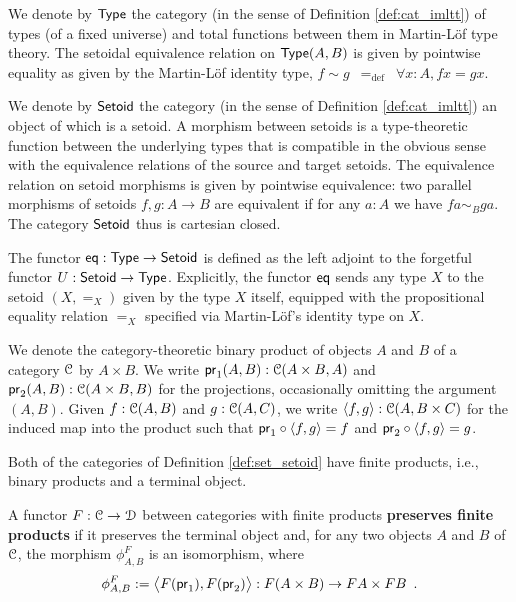 \documentclass[a4paper,USenglish]{lipics}
\newcommand{\fat}[1]{\textbf{#1}}
\begin{document}
\begin{definition}
\label{def:set_setoid}
 We denote by $\Set$ the category (in the sense of Definition \ref{def:cat_imltt}) of types (of a fixed universe) and total functions between them in Martin-L\"of type theory. 
 The setoidal equivalence relation on $\Set(A,B)$ is given by pointwise equality as given by the Martin-Löf identity type,
   $f \sim g \enspace =_{\text{def}} \enspace \forall x:A, fx = gx$.
 
 We denote by $\Setoid$ the category (in the sense of Definition \ref{def:cat_imltt}) an object of which is a setoid.
 A morphism between setoids is a type-theoretic function between the underlying types that is compatible in the obvious sense with the equivalence relations of the source and target setoids.
 The equivalence relation on setoid morphisms is given by pointwise equivalence:
 two parallel morphisms of setoids $f,g:A\to B$ are equivalent if for any $a:A$ we have $fa \sim_B ga$.
 The category $\Setoid$ thus is cartesian closed.
 
\end{definition}



\begin{definition}
\label{def:eq}
 The functor $\eq : \Set\to\Setoid$ is defined as the left adjoint to the forgetful functor $U : \Setoid \to \Set$.
  Explicitly, the functor $\eq$ sends any type $X$ to the setoid $(X,=_X)$ given by the type $X$ itself, equipped
  with the propositional equality relation $=_X$ specified via Martin-L\"of's identity type on $X$.
\end{definition}


\begin{rem}
  We denote the category-theoretic binary product of objects $A$ and $B$ of a category $\C$ by $A\times B$.
  We write $\pr_1(A,B) : \C(A\times B, A)$ and $\pr_2(A,B) :\C(A\times B, B)$ for the projections, occasionally omitting the 
  argument $(A,B)$.
  Given $f : \C(A, B)$ and $g : \C(A,C)$, we write $\langle f,g\rangle : \C(A,B\times C)$ for the induced map into the product such that
  $\comp{\langle f,g\rangle}{\pr_1} = f$ and $\comp{\langle f,g\rangle}{\pr_2} = g$.
\end{rem}

Both of the categories of Definition \ref{def:set_setoid} have finite products, i.e., binary products and a terminal object.

\begin{definition}
\label{def:monoidal_functor}
 A functor $F:\C\to\D$ between categories with finite products \fat{preserves finite products} if it preserves the terminal object and,
 for any two objects $A$ and $B$ of $\C$,
  the morphism $\phi^F_{A,B}$ is an isomorphism, where
 \[ \phi^F_{A,B} := \bigl\langle F(\pr_1), F(\pr_2) \bigr\rangle : F(A \times B) \to FA\times FB \enspace . \] %
\end{definition}
\end{document}
